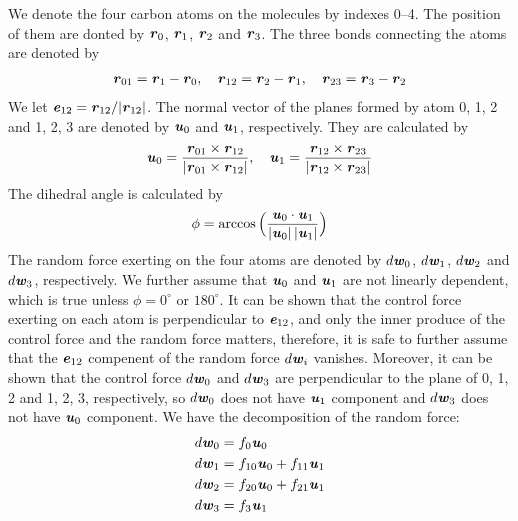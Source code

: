 \documentclass[aip,jcp,a4paper,reprint,onecolumn]{revtex4-1}
\newcommand{\vect}[1]{\textbf{\textit{#1}}}
\newcommand{\randomf}{d\vect w}
\begin{document}
We denote the four carbon atoms on the molecules by indexes 0--4. The
position of them are donted by $\vect r_0$, $\vect r_1$, $\vect r_2$
and $\vect r_3$. The three bonds connecting the atoms are denoted by
\begin{align}
  \vect r_{01} = \vect r_1 - \vect r_0, \quad
  \vect r_{12} = \vect r_2 - \vect r_1, \quad
  \vect r_{23} = \vect r_3 - \vect r_2
\end{align}
We let $\vect e_{12} = \vect r_{12} / \vert\vect r_{12}\vert$.  The
normal vector of the planes formed by atom 0, 1, 2 and 1, 2, 3 are
denoted by $\vect u_0$ and $\vect u_1$, respectively. They are
calculated by
\begin{align}
  \vect u_0 = \frac{\vect r_{01} \times\vect r_{12}}{\vert \vect r_{01} \times\vect r_{12}\vert},\quad
  \vect u_1 = \frac{\vect r_{12} \times\vect r_{23}}{\vert \vect r_{12} \times\vect r_{23}\vert}
\end{align}
The dihedral angle is calculated by
\begin{align}
  \phi = \arccos\Big(\frac{\vect u_0\cdot\vect u_1}{\vert \vect u_0\vert\,\vert\vect u_1\vert}\Big)
\end{align}
The random force exerting on the four atoms are denoted by
$\randomf_0$, $\randomf_1$, $\randomf_2$ and $\randomf_3$, respectively. We
further assume that $\vect u_0$ and $\vect u_1$ are not linearly
dependent, which is true unless $\phi = 0^\circ$ or $180^\circ$.  It
can be shown that the control force exerting on each atom is
perpendicular to $\vect e_{12}$, and only the inner produce of the
control force and the random force matters, therefore, it is safe to
further assume that the $\vect e_{12}$ compenent of the random force
$\randomf_i$ vanishes. Moreover, it can be shown that the control force
$\randomf_0$ and $\randomf_3$ are perpendicular to the plane of 0, 1, 2
and 1, 2, 3, respectively, so $\randomf_0$ does not have $\vect u_1$
component and $\randomf_3$ does not have $\vect u_0$ component.  We have the
decomposition of the random force:
\begin{align}
  \randomf_0 &= f_0 \vect u_0\\
  \randomf_1 &= f_{10}\vect u_0 + f_{11}\vect u_1\\
  \randomf_2 &= f_{20}\vect u_0 + f_{21}\vect u_1\\
  \randomf_3 &= f_3 \vect u_1
\end{align}
\end{document}
